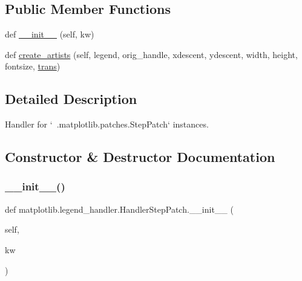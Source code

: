 \subsection*{Public Member Functions}
\begin{DoxyCompactItemize}
\item 
def \hyperlink{classmatplotlib_1_1legend__handler_1_1HandlerStepPatch_a7efef602812e5a14e99407d833b90bee}{\+\_\+\+\_\+init\+\_\+\+\_\+} (self, kw)
\item 
def \hyperlink{classmatplotlib_1_1legend__handler_1_1HandlerStepPatch_a685e0f0cfc77ba66dc94ccd66ffd2a81}{create\+\_\+artists} (self, legend, orig\+\_\+handle, xdescent, ydescent, width, height, fontsize, \hyperlink{size_2foo_8f90_afabfd8da71309850231a00e53c61f106}{trans})
\end{DoxyCompactItemize}


\subsection{Detailed Description}
\begin{DoxyVerb}Handler for `~.matplotlib.patches.StepPatch` instances.
\end{DoxyVerb}
 

\subsection{Constructor \& Destructor Documentation}
\mbox{\label{classmatplotlib_1_1legend__handler_1_1HandlerStepPatch_a7efef602812e5a14e99407d833b90bee}} 
\subsubsection{\texorpdfstring{\+\_\+\+\_\+init\+\_\+\+\_\+()}{\_\_init\_\_()}}
{\footnotesize\ttfamily def matplotlib.\+legend\+\_\+handler.\+Handler\+Step\+Patch.\+\_\+\+\_\+init\+\_\+\+\_\+ (\begin{DoxyParamCaption}\item[{}]{self,  }\item[{}]{kw }\end{DoxyParamCaption})}


